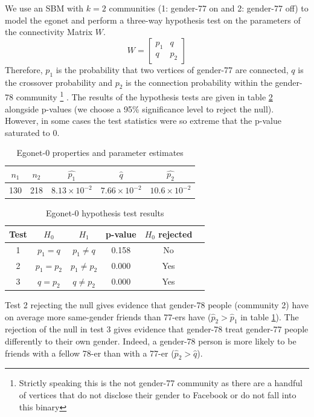 \documentclass[]{article}
\begin{document}
\begin{multicols*}{2}
We use an SBM with $k=2$ communities (1: gender-77 on and 2: gender-77 off) to model the egonet and perform a three-way hypothesis test on the parameters of the connectivity Matrix $W$.
%
\begin{equation}
	W = \begin{bmatrix}
		p_1 & q \\
		q & p_2
	\end{bmatrix}
\end{equation}
%
Therefore, $p_1$ is the probability that two vertices of gender-77 are connected, $q$ is the crossover probability and $p_2$ is the connection probability within the gender-78 community
\footnote{Strictly speaking this is the not gender-77 community as there are a handful of vertices that do not disclose their gender to Facebook or do not fall into this binary}
. The results of the hypothesis tests are given in table \ref{tab:egonet-0-hyp-tests} alongside p-values (we choose a 95\% significance level to reject the null). However, in some cases the test statistics were so extreme that the p-value saturated to 0.
%
\begin{table}[H]
	\centering
	\begin{tabular}{c c c c c}
		$n_1$                & $n_2$                & $\hat{p_1}$ & $\hat{q}$ & $\hat{p_2}$       \\ \hline
		130 & 218 & $8.13 \times 10^{-2}$ & $7.66 \times 10^{-2}$ & $10.6 \times 10^{-2}$
	\end{tabular}
	\caption{Egonet-0 properties and parameter estimates}
	\label{tab:egonet-0-props}
\end{table}
%
\begin{table}[H]
	\centering
	\begin{tabular}{cccccc}
		Test & $H_0$                & $H_1$                & p-value & $H_0$ rejected       \\ \hline
		1    & $p_1 = q$            & $p_1 \neq q$         & 0.158 &  No                \\
		2    & $p_1 = p_2$ & $p_1 \neq p_2$ & 0.000 & Yes \\
		3    & $q = p_2$ & $q \neq p_2$ &  0.000 & Yes
	\end{tabular}
	\caption{Egonet-0 hypothesis test results}
	\label{tab:egonet-0-hyp-tests}
\end{table}

Test 2 rejecting the null gives evidence that gender-78 people (community 2) have on average more same-gender friends than 77-ers have ($\hat{p}_2 > \hat{p}_1$ in table \ref{tab:egonet-0-props}). The rejection of the null in test 3 gives evidence that gender-78 treat gender-77 people differently to their own gender. Indeed, a gender-78 person is more likely to be friends with a fellow 78-er than with a 77-er ($\hat{p}_2 > \hat{q}$).


\end{multicols*}
\end{document}
